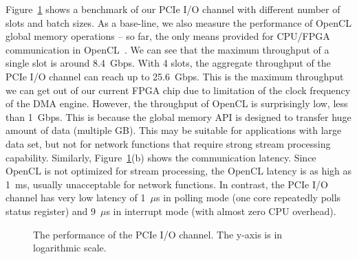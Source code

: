 Figure~\ref{clicknp:fig:pcie} shows a benchmark of our PCIe I/O channel with different number of slots and batch sizes.
As a base-line, we also measure the performance of OpenCL global memory operations -- so far, the only means provided
for CPU/FPGA communication in OpenCL~\cite{opencl}. 
%
We can see that the maximum throughput of a single slot is around 8.4~Gbps. 
With 4 slots, the aggregate throughput of the PCIe I/O channel can reach up to 25.6~Gbps. 
This is the maximum throughput we can get out of our current FPGA chip due to limitation of the clock frequency of the DMA engine. 
However, the throughput of OpenCL is surprisingly low, less than 1~Gbps. This is because the global memory API is designed
to transfer huge amount of data (multiple GB). This may be suitable for applications with large data set, but not for 
network functions that require strong stream processing capability.
Similarly, Figure~\ref{clicknp:fig:pcie}(b) shows the communication latency. Since OpenCL is not optimized for stream processing,
the OpenCL latency is as high as 1~ms, usually unacceptable for network functions. 
In contrast, the PCIe I/O channel has very low latency of 1~$\mu$s in polling mode (one core repeatedly polls status register) and 9~$\mu$s in interrupt mode (with almost zero CPU overhead).

\begin{figure}[t!]
	\centering

	\caption{The performance of the PCIe I/O channel. The y-axis is in logarithmic scale. }

	\label{clicknp:fig:pcie}
\end{figure}

